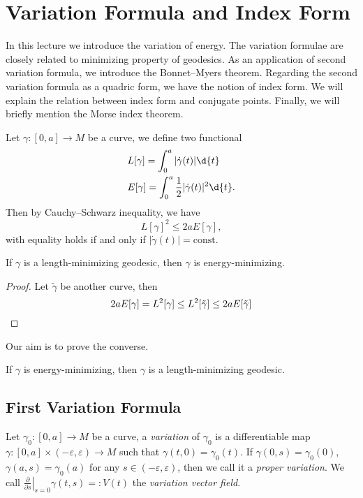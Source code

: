 \chapter{Variation Formula and Index Form}
In this lecture we introduce the variation of energy.
The variation formulae are closely related to minimizing property of geodesics.
As an application of second variation formula, we introduce the Bonnet--Myers theorem.
Regarding the second variation formula as a quadric form, we have the notion of index form.
We will explain the relation between index form and conjugate points.
Finally, we will briefly mention the Morse index theorem.

Let $\gamma:[0,a]\to M$ be a curve, we define two functional
\begin{align*}
    &L[\gamma]=\int_0^a|\dot{\gamma}(t)|\d{t}\\
    &E[\gamma]=\int_0^a\frac{1}{2}|\dot{\gamma}(t)|^2\d{t}.
\end{align*}
Then by Cauchy--Schwarz inequality, we have
\[L[\gamma]^2\leq 2aE[\gamma],\]
with equality holds if and only if $|\dot{\gamma}(t)|=\text{const}$.
\begin{prop}\label{length-min implies energy-min}
    If $\gamma$ is a length-minimizing geodesic, then $\gamma$ is energy-minimizing.
\end{prop}
\begin{proof}
    Let $\tilde{\gamma}$ be another curve, then
    \[2aE[\gamma]=L^2[\gamma]\leq L^2[\tilde{\gamma}]\leq 2aE[\tilde{\gamma}]\qedhere\]
\end{proof}

Our aim is to prove the converse.
\begin{prop}\label{energy-min implies length-min}
    If $\gamma$ is energy-minimizing, then $\gamma$ is a length-minimizing geodesic.
\end{prop}

\section{First Variation Formula}

\begin{defn}[Variation]
    Let $\gamma_0:[0,a]\to M$ be a curve, a \emph{variation} of $\gamma_0$ is a differentiable map $\gamma:[0,a]\times(-\varepsilon,\varepsilon)\to M$ such that $\gamma(t,0)=\gamma_0(t)$.
    If $\gamma(0,s)=\gamma_0(0)$, $\gamma(a,s)=\gamma_0(a)$ for any $s\in(-\varepsilon,\varepsilon)$, then we call it a \emph{proper variation}.
    We call $\left.\frac{\partial{}}{\partial{s}}\right|_{s=0}\gamma(t,s)=:V(t)$ the \emph{variation vector field}.
\end{defn}

